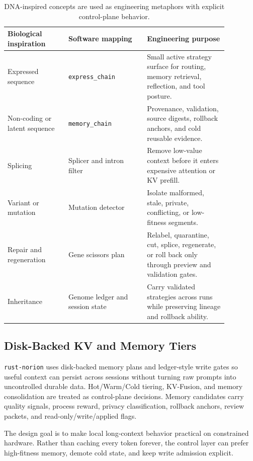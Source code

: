 \documentclass[10pt]{article}
\begin{document}
\begin{table}[t]
\centering
\small
\begin{tabular}{p{0.24\linewidth}p{0.31\linewidth}p{0.32\linewidth}}
\toprule
Biological inspiration & Software mapping & Engineering purpose \\
\midrule
Expressed sequence & \texttt{express\_chain} & Small active strategy
surface for routing, memory retrieval, reflection, and tool posture. \\
Non-coding or latent sequence & \texttt{memory\_chain} & Provenance,
validation, source digests, rollback anchors, and cold reusable evidence. \\
Splicing & Splicer and intron filter & Remove low-value context before it
enters expensive attention or KV prefill. \\
Variant or mutation & Mutation detector & Isolate malformed, stale, private,
conflicting, or low-fitness segments. \\
Repair and regeneration & Gene scissors plan & Relabel, quarantine, cut,
splice, regenerate, or roll back only through preview and validation gates. \\
Inheritance & Genome ledger and session state & Carry validated strategies
across runs while preserving lineage and rollback ability. \\
\bottomrule
\end{tabular}
\caption{DNA-inspired concepts are used as engineering metaphors with explicit
control-plane behavior.}
\label{tab:mapping}
\end{table}

\subsection{Disk-Backed KV and Memory Tiers}

\texttt{rust-norion} uses disk-backed memory plans and ledger-style write gates
so useful context can persist across sessions without turning raw prompts into
uncontrolled durable data. Hot/Warm/Cold tiering, KV-Fusion, and memory
consolidation are treated as control-plane decisions. Memory candidates carry
quality signals, process reward, privacy classification, rollback anchors,
review packets, and read-only/write/applied flags.

The design goal is to make local long-context behavior practical on constrained
hardware. Rather than caching every token forever, the control layer can prefer
high-fitness memory, demote cold state, and keep write admission explicit.
\end{document}
